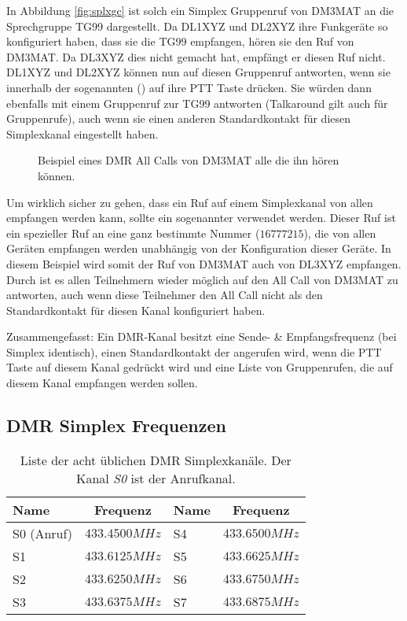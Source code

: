 In Abbildung \ref{fig:splxgc} ist solch ein Simplex Gruppenruf von DM3MAT an die Sprechgruppe TG99 dargestellt. Da DL1XYZ und DL2XYZ ihre Funkgeräte so konfiguriert haben, dass sie die TG99 empfangen, hören sie den Ruf von DM3MAT. Da DL3XYZ dies nicht gemacht hat, empfängt er diesen Ruf nicht. DL1XYZ und DL2XYZ können nun auf diesen Gruppenruf antworten, wenn sie innerhalb der sogenannten  () auf ihre PTT Taste drücken. Sie würden dann ebenfalls mit einem Gruppenruf zur TG99 antworten (Talkaround gilt auch für Gruppenrufe), auch wenn sie einen anderen Standardkontakt für diesen Simplexkanal eingestellt haben.

\begin{figure}[!ht]
  \centering
  
  \caption{Beispiel eines DMR All Calls von DM3MAT alle die ihn hören können.} \label{fig:splxac}
\end{figure}

Um wirklich sicher zu gehen, dass ein Ruf auf einem Simplexkanal von allen empfangen werden kann, sollte ein sogenannter  verwendet werden. Dieser Ruf ist ein spezieller Ruf an eine ganz bestimmte Nummer ($16777215$), die von allen Geräten empfangen werden unabhängig von der Konfiguration dieser Geräte. In diesem Beispiel wird somit der Ruf von DM3MAT auch von DL3XYZ empfangen. Durch  ist es allen Teilnehmern wieder möglich auf den All Call von DM3MAT zu antworten, auch wenn diese Teilnehmer den All Call nicht als den Standardkontakt für diesen Kanal konfiguriert haben. 

\begin{merke}
 Zusammengefasst: Ein DMR-Kanal besitzt eine Sende- \& Empfangsfrequenz (bei Simplex identisch), einen Standardkontakt der angerufen wird, wenn die PTT Taste auf diesem Kanal gedrückt wird und eine Liste von Gruppenrufen, die auf diesem Kanal empfangen werden sollen. 
\end{merke}

\subsection{DMR Simplex Frequenzen}
\begin{table}[!ht]
 \centering
 \begin{tabular}{|l|c||l|c|} \hline
  Name & Frequenz & Name & Frequenz \\ \hline \hline
  S0 (Anruf) & $433.4500 MHz$ & S4 & $433.6500 MHz$ \\
  S1         & $433.6125 MHz$ & S5 & $433.6625 MHz$ \\
  S2         & $433.6250 MHz$ & S6 & $433.6750 MHz$ \\
  S3         & $433.6375 MHz$ & S7 & $433.6875 MHz$ \\ \hline
 \end{tabular}
 \caption{Liste der acht üblichen DMR Simplexkanäle. Der Kanal \emph{S0} ist der Anrufkanal.} \label{tab:simplex}
\end{table}

